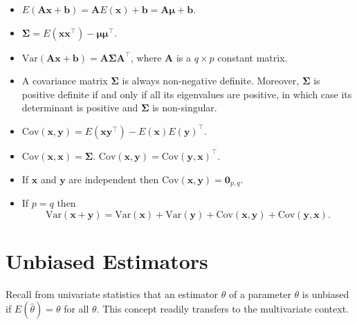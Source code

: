 \documentclass[]{book}
\providecommand{\tightlist}{%
  \setlength{\itemsep}{0pt}\setlength{\parskip}{0pt}}
\theoremstyle{definition}
\theoremstyle{definition}
\theoremstyle{definition}
\theoremstyle{remark}
\begin{document}
\begin{itemize}
\tightlist
\item
  \(E(\boldsymbol A\boldsymbol x+ \boldsymbol b) = \boldsymbol AE(\boldsymbol x) + \boldsymbol b=\boldsymbol A\boldsymbol \mu+\boldsymbol b\).
\item
  \(\boldsymbol \Sigma= E(\boldsymbol x\boldsymbol x^\top) - \boldsymbol \mu\boldsymbol \mu^\top\).
\item
  \(\text{Var}(\boldsymbol A\boldsymbol x+ \boldsymbol b) = \boldsymbol A\boldsymbol \Sigma\boldsymbol A^\top\), where \(\boldsymbol A\) is a \(q \times p\) constant matrix.
\item
  A covariance matrix \(\boldsymbol \Sigma\) is always non-negative
  definite. Moreover, \(\boldsymbol \Sigma\) is positive definite if and only
  if all its eigenvalues are positive, in which case its
  determinant is positive and \(\boldsymbol \Sigma\) is non-singular.
\item
  \(\text{Cov}(\boldsymbol x,\boldsymbol y) = E(\boldsymbol x\boldsymbol y^\top) - E(\boldsymbol x) E(\boldsymbol y)^\top\).
\item
  \(\text{Cov}(\boldsymbol x,\boldsymbol x) = \boldsymbol \Sigma\).
  \(\text{Cov}(\boldsymbol x,\boldsymbol y) = \text{Cov}(\boldsymbol y,\boldsymbol x)^\top\).
\item
  If \(\boldsymbol x\) and \(\boldsymbol y\) are independent then \(\text{Cov}(\boldsymbol x,\boldsymbol y) = {\mathbf 0}_{p,q}\).
\item
  If \(p=q\) then
  \[
  \text{Var}(\boldsymbol x+ \boldsymbol y) = \text{Var}(\boldsymbol x) + \text{Var}(\boldsymbol y) + \text{Cov}(\boldsymbol x,\boldsymbol y) + \text{Cov}(\boldsymbol y,\boldsymbol x).
  \]
\end{itemize}

\hypertarget{unbiased-estimators}{%
\section{Unbiased Estimators}\label{unbiased-estimators}}

Recall from univariate statistics that an estimator \(\hat{\theta}\) of a parameter \(\theta\) is unbiased if \(E(\hat{\theta}) = \theta\) for all \(\theta\). This concept readily transfers to the multivariate context.
\end{document}
